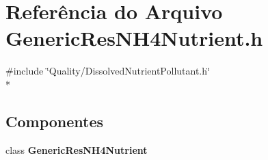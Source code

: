\section{Referência do Arquivo Generic\+Res\+N\+H4\+Nutrient.\+h}
\label{_generic_res_n_h4_nutrient_8h}
{\ttfamily \#include \char`\"{}Quality/\+Dissolved\+Nutrient\+Pollutant.\+h\char`\"{}}\\*
\subsection*{Componentes}
\begin{DoxyCompactItemize}
\item 
class {\bf Generic\+Res\+N\+H4\+Nutrient}
\end{DoxyCompactItemize}
